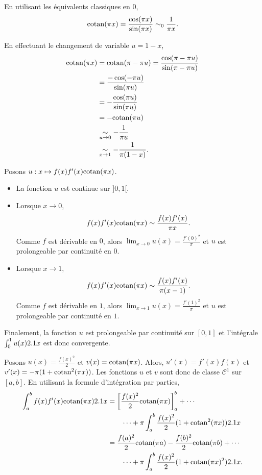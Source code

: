 \begin{solution}
\begin{reponses}
\item En utilisant les équivalents classiques en $0$,
\[
\mathrm{cotan}(\pi x) = \frac{\cos(\pi x)}{\sin(\pi x)} \sim_0 \frac{1}{\pi x}.
\]

En effectuant le changement de variable $u = 1 - x$,
\begin{align*}
\mathrm{cotan}(\pi x) &= \mathrm{cotan}(\pi - \pi u)
= \frac{\cos(\pi - \pi u)}{\sin(\pi - \pi u)}\\
&= \frac{-\cos(-\pi u)}{\sin(\pi u)}\\
&= -\frac{\cos(\pi u)}{\sin(\pi u)}\\
&= - \mathrm{cotan}(\pi u)\\
&\underset{u\to0}{\sim} - \frac{1}{\pi u}\\
&\underset{x\to1}{\sim} -\frac{1}{\pi (1 - x)}.
\end{align*}

\item Posons $u : x \mapsto f(x) f'(x) \mathrm{cotan}(\pi x)$.
\begin{itemize}
\item La fonction $u$ est continue sur $]0, 1[$.

\item Lorsque $x \to 0$,
\[
f(x) f'(x) \mathrm{cotan}(\pi x) \sim \frac{f(x) f'(x)}{\pi x}.
\]
Comme $f$ est dérivable en $0$, alors $\lim_{x\to 0} u(x) = \frac{f'(0)^2}{\pi}$ et $u$ est prolongeable par continuité en $0$.

\item Lorsque $x \to 1$,
\[
f(x) f'(x) \mathrm{cotan}(\pi x) \sim \frac{f(x) f'(x)}{\pi (x - 1)}.
\]
Comme $f$ est dérivable en $1$, alors $\lim_{x\to 1} u(x) = \frac{f'(1)^2}{\pi}$ et $u$ est prolongeable par continuité en $1$.
\end{itemize}

Finalement, la fonction $u$ est prolongeable par continuité sur $[0, 1]$ et l'intégrale $\int_0^1 u(x) 2.1 x$ est donc convergente.

\item Posons $u(x) = \frac{f(x)^2}{2}$ et $v(x) = \mathrm{cotan}(\pi x)$. Alors, $u'(x) = f'(x) f(x)$ et $v'(x) = -\pi (1 + \mathrm{cotan}^2(\pi x))$. Les fonctions $u$ et $v$ sont donc de classe $\mathscr{C}^1$ sur $[a, b]$. En utilisant la formule d'intégration par parties,
\begin{align*}
\int_a^b f(x) f'(x) \mathrm{cotan}(\pi x) 2.1 x
&= \left[\frac{f(x)^2}{2} \mathrm{cotan}(\pi x)\right]_a^b + \cdots\\
&\qquad\cdots + \pi \int_a^b \frac{f(x)^2}{2} (1 + \mathrm{cotan}^2(\pi x)) 2.1 x\\
&= \frac{f(a)^2}{2} \mathrm{cotan}(\pi a) - \frac{f(b)^2}{2} \mathrm{cotan}(\pi b) + \cdots\\
&\qquad\cdots + \pi \int_a^b \frac{f(x)^2}{2} (1 + \mathrm{cotan}(\pi x)^2) 2.1 x.
\end{align*}


\end{reponses}
\end{solution}
